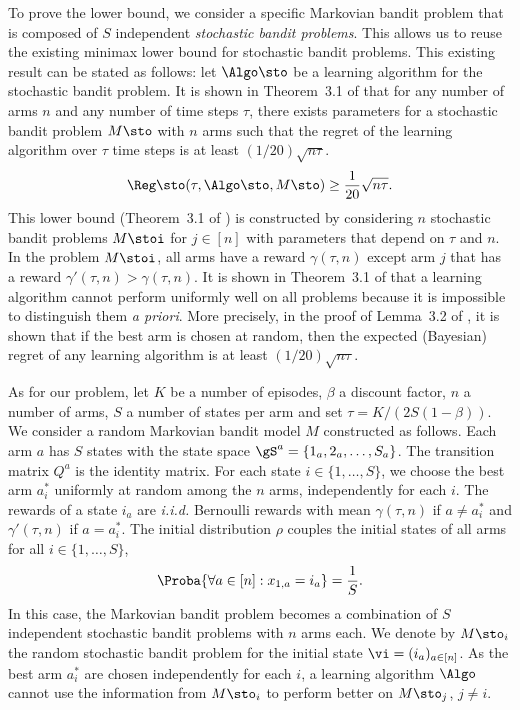 To prove the lower bound, we consider a specific Markovian bandit problem that is composed of $S$ independent \emph{stochastic bandit problems}. 
This allows us to reuse the existing minimax lower bound for stochastic bandit problems. 
This existing result can be stated as follows: let $\Algo\sto$ be a learning algorithm for the stochastic bandit problem. 
It is shown in Theorem~3.1 of \cite{bubeck2012regret} that for any number of arms $n$ and any number of time steps $\tau$, there exists parameters for a stochastic bandit problem $M\sto$ with $n$ arms such that the regret of the learning algorithm over $\tau$ time steps is at least $(1/20)\sqrt{n \tau}$. 
\begin{align}
    \label{eq:regret_sto}
    \Reg\sto( \tau, \Algo\sto, M\sto) \ge \frac1{20}\sqrt{n\tau}. 
\end{align}
This lower bound (Theorem~3.1 of \cite{bubeck2012regret}) is constructed by considering $n$ stochastic bandit problems $M\stoi$ for $j\in[n]$ with parameters that depend on $\tau$ and $n$. 
In the problem $M\stoi$, all arms have a reward $\gamma(\tau,n)$ except arm $j$ that has a reward $\gamma'(\tau,n)>\gamma(\tau,n)$. 
It is shown in Theorem~3.1 of \cite{bubeck2012regret} that a learning algorithm cannot perform uniformly well on all problems because it is impossible to distinguish them \emph{a priori}. 
More precisely, in the proof of Lemma~3.2 of \cite{bubeck2012regret}, it is shown that if the best arm is chosen at random, then the expected (Bayesian) regret of any learning algorithm is at least $(1/20)\sqrt{n \tau}$.

As for our problem, let $K$ be a number of episodes, $\beta$ a discount factor, $n$ a number of arms, $S$ a number of states per arm and set $\tau=K/(2S(1-\beta))$. 
We consider a random Markovian bandit model $M$ constructed as follows. 
Each arm $a$ has $S$ states with the state space $\gS^a = \{ 1_a,2_a,\ldots, S_a\}$. 
The transition matrix $Q^a$ is the identity matrix. 
For each state $i\in\{1,\dots, S\}$, we choose the best arm $a^*_i$ uniformly at random among the $n$ arms, independently for each $i$. 
The rewards of a state $i_a$ are \emph{i.i.d.} Bernoulli rewards with mean $\gamma(\tau,n)$ if $a\ne a^*_i$ and $\gamma'(\tau,n)$ if $a=a^*_i$. 
The initial distribution $\rho$ couples the initial states of all arms for all $i\in\{1,\dots, S\}$, 
\begin{align*}
    \Proba{\forall a\in[n]: x_{1,a} = i_a} = \frac1S. 
\end{align*} 
In this case, the Markovian bandit problem becomes a combination of $S$ independent stochastic bandit problems with $n$ arms each. 
We denote by $M\sto_i$ the random stochastic bandit problem for the initial state $\vi=(i_a)_{a\in[n]}$. As the best arm $a^*_i$ are chosen independently for each $i$, a learning algorithm $\Algo$ cannot use the information from $M\sto_i$ to perform better on $M\sto_j$, $j\ne i$.


